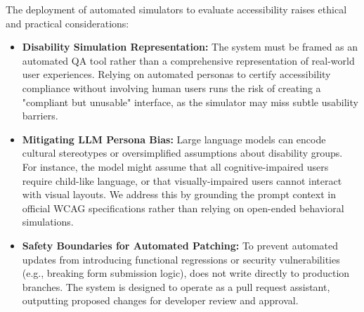 The deployment of automated simulators to evaluate accessibility raises ethical and practical considerations:

\begin{itemize}
  \item \textbf{Disability Simulation Representation:} The system must be framed as an automated QA tool rather than a comprehensive representation of real-world user experiences. Relying on automated personas to certify accessibility compliance without involving human users runs the risk of creating a "compliant but unusable" interface, as the simulator may miss subtle usability barriers.
  \item \textbf{Mitigating LLM Persona Bias:} Large language models can encode cultural stereotypes or oversimplified assumptions about disability groups. For instance, the model might assume that all cognitive-impaired users require child-like language, or that visually-impaired users cannot interact with visual layouts. We address this by grounding the prompt context in official WCAG specifications rather than relying on open-ended behavioral simulations.
  \item \textbf{Safety Boundaries for Automated Patching:} To prevent automated updates from introducing functional regressions or security vulnerabilities (e.g., breaking form submission logic), \versimux{} does not write directly to production branches. The system is designed to operate as a pull request assistant, outputting proposed changes for developer review and approval.
\end{itemize}
